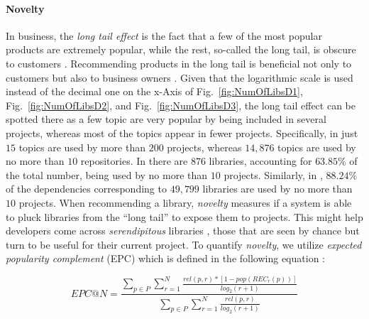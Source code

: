 
\paragraph{\textbf{Novelty}} In business, the \emph{long tail effect} is the fact that a few of the most popular products are extremely popular, while the rest, so-called the long tail, is obscure to customers \cite{Anderson:2006:LTW:1197299}. Recommending products in the long tail is beneficial not only to customers but also to business owners \cite{Vargas_sales_diversity_14}. 
Given that the logarithmic scale is used instead of the decimal one on the x-Axis of Fig.~\ref{fig:NumOfLibsD1}, Fig.~\ref{fig:NumOfLibsD2}, and Fig.~\ref{fig:NumOfLibsD3}, the long tail effect can be spotted there as a few topic are very popular by being included in several projects, whereas most of the topics appear in fewer projects. Specifically, in  just $15$ topics are used by more than $200$ projects, whereas $14,876$ topics are used by no more than $10$ repositories. In  there are $876$ libraries, accounting for $63.85\%$ of the total number, being used by no more than $10$ projects. Similarly, in , $88.24\%$ of the dependencies corresponding to $49,799$ libraries are used by no more than $10$ projects. %
When recommending a library, \emph{novelty} measures if a system is able to 
pluck libraries from the ``long tail'' to expose them to projects. This might 
help developers come across \emph{serendipitous} libraries 
\cite{Ge:2010_catalog_coverage}, \eg those that are seen by chance but turn to 
be useful for their current project. To quantify \emph{novelty}, we utilize 
\emph{expected popularity complement} (EPC) which is defined in the following 
equation \cite{Vargas_sales_diversity_14}: %

\begin{equation}\label{eqn:EPC}
EPC@N = \frac{\sum_{p\in P}\sum_{r=1}^{N} \frac{ rel(p,r)* \left [ 1-pop(REC_{r}(p)) \right ]}{log_{2}(r+1)} }{\sum_{p\in P}\sum_{r=1}^{N} \frac{rel(p,r)}{log_{2}(r+1)}}
\end{equation}

